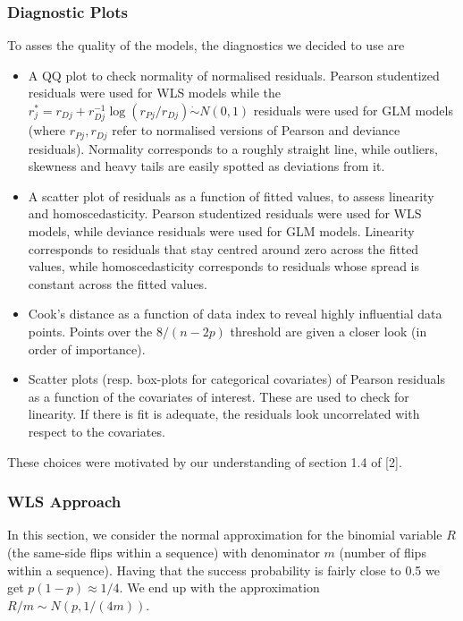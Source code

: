 \documentclass[a4paper, 12pt,oneside]{article}
\begin{document}
			\subsubsection{Diagnostic Plots}
				To asses the quality of the models, the diagnostics we decided to use are 
				\begin{itemize}
					\item A QQ plot to check normality of normalised residuals. Pearson studentized residuals were used for WLS models while the $r_j^*=r_{D j}+r_{D j}^{-1} \log \left(r_{P j} / r_{D j}\right) \dot{\sim} N(0,1)$ residuals were used for GLM models (where $r_{P j},r_{D j}$ refer to normalised versions of Pearson and deviance residuals). Normality corresponds to a roughly straight line, while outliers, skewness and heavy tails are easily spotted as deviations from it.
					\item A scatter plot of residuals as a function of fitted values, to assess linearity and homoscedasticity. Pearson studentized residuals were used for WLS models, while deviance residuals were used for GLM models. Linearity corresponds to residuals that stay centred around zero across the fitted values, while homoscedasticity corresponds to residuals whose spread is constant across the fitted values.
					\item Cook's distance as a function of data index to reveal highly influential data points. Points over the $8/(n-2p)$ threshold are given a closer look (in order of importance). 
					\item Scatter plots (resp. box-plots for categorical covariates) of Pearson residuals as a function of the covariates of interest. These are used to check for linearity. If there is fit is adequate, the residuals look uncorrelated with respect to the covariates. 
				\end{itemize}
				These choices were motivated by our understanding of section 1.4 of [2]. 
			\subsubsection{WLS Approach}
			In this section, we consider the normal approximation for the binomial variable $R$ (the same-side flips within a sequence) with denominator $m$ (number of flips within a sequence). 
			Having that the success probability is fairly close to 0.5 we get $p(1-p)\approx1/4$. We end up with the approximation $R/m \sim N(p,1/(4m))$. 
\end{document}
